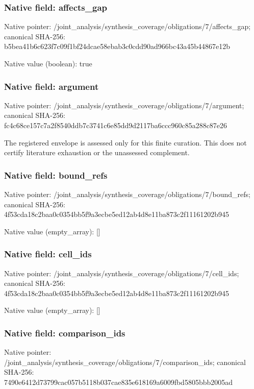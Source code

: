 \documentclass[10pt,a4paper]{article}
\begin{document}
\subsubsection{Native field: affects\_\allowbreak{}gap}
Native pointer: /joint\_\allowbreak{}analysis/synthesis\_\allowbreak{}coverage/obligations/7/affects\_\allowbreak{}gap; canonical SHA-256: b5bea41b6c623f7c09f1bf24dcae58ebab3c0cdd90ad966bc43a45b44867e12b

Native value (boolean): true

\subsubsection{Native field: argument}
Native pointer: /joint\_\allowbreak{}analysis/synthesis\_\allowbreak{}coverage/obligations/7/argument; canonical SHA-256: fc4c68ce157c7a2f8540ddb7c3741c6e85dd9d2117ba6ccc960c85a288c87e26

\begingroup\raggedright\sloppy The registered envelope is assessed only for this finite curation. This does not certify literature exhaustion or the unassessed complement.\par\endgroup

\subsubsection{Native field: bound\_\allowbreak{}refs}
Native pointer: /joint\_\allowbreak{}analysis/synthesis\_\allowbreak{}coverage/obligations/7/bound\_\allowbreak{}refs; canonical SHA-256: 4f53cda18c2baa0c0354bb5f9a3ecbe5ed12ab4d8e11ba873c2f11161202b945

Native value (empty\_\allowbreak{}array): []

\subsubsection{Native field: cell\_\allowbreak{}ids}
Native pointer: /joint\_\allowbreak{}analysis/synthesis\_\allowbreak{}coverage/obligations/7/cell\_\allowbreak{}ids; canonical SHA-256: 4f53cda18c2baa0c0354bb5f9a3ecbe5ed12ab4d8e11ba873c2f11161202b945

Native value (empty\_\allowbreak{}array): []

\subsubsection{Native field: comparison\_\allowbreak{}ids}
Native pointer: /joint\_\allowbreak{}analysis/synthesis\_\allowbreak{}coverage/obligations/7/comparison\_\allowbreak{}ids; canonical SHA-256: 7490e6412d73799cac057b5118b037cae835e618169a6009fbd5805bbb2005ad
\end{document}
